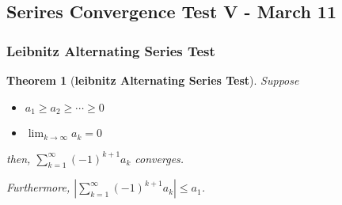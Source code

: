 \documentclass[12pt]{article}
\theoremstyle{plain}
\newtheorem{theorem}{Theorem}[subsection]
\newcommand{\abs}[1]{\left| #1 \right|}
\begin{document}
\newpage
\subsection{Serires Convergence Test V - March 11}

\subsubsection{Leibnitz Alternating Series Test}
\begin{theorem}[\textbf{leibnitz Alternating Series Test}]
	Suppose 
	\begin{itemize}
		\item $a_1 \geq a_2 \geq \cdots \geq 0$
		\item $\lim_{k\to\infty} a_k = 0$
	\end{itemize}
	then, $\sum_{k=1}^{\infty} (-1)^{k+1} a_k$ converges.
	
	Furthermore, $\abs{\sum_{k=1}^{\infty} (-1)^{k+1} a_k}\leq a_1$. 
\end{theorem}
\end{document}
